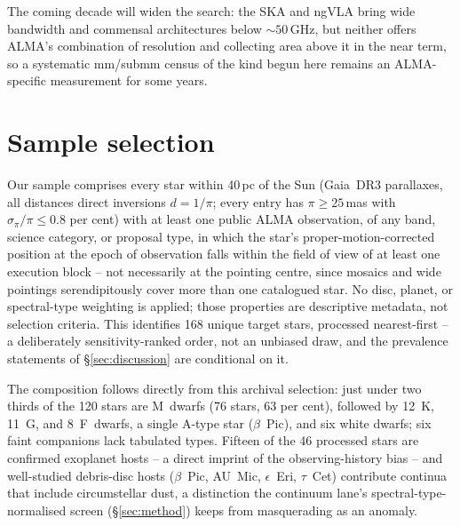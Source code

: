 \documentclass{openjournal}
\begin{document}
The coming decade will widen the search: the SKA
\citep{SKA2015,SKA2026review} and ngVLA \citep{ngVLASETI2022} bring
wide bandwidth and commensal architectures below ${\sim}50$\,GHz, but
neither offers ALMA's combination of resolution and collecting area
above it in the near term, so a systematic mm/submm census of the
kind begun here remains an ALMA-specific measurement for some years.

\section{Sample selection}
\label{sec:sample}

Our sample comprises every star within 40\,pc of the Sun (Gaia~DR3
parallaxes, all distances direct inversions $d = 1/\pi$; every entry
has $\pi \ge 25$\,mas with $\sigma_\pi/\pi \le 0.8$ per cent) with at
least one public ALMA observation, of any band, science category, or
proposal type, in which the star's proper-motion-corrected position at
the epoch of observation falls within the field of view of at least
one execution block -- not necessarily at the pointing centre, since
mosaics and wide pointings serendipitously cover more than one
catalogued star. No disc, planet, or spectral-type weighting is
applied; those properties are descriptive metadata, not selection
criteria. This identifies 168 unique target stars, processed
nearest-first -- a deliberately sensitivity-ranked order, not an
unbiased draw, and the prevalence statements of
\S\ref{sec:discussion} are conditional on it.

The composition follows directly from this archival selection: just
under two thirds of the 120 stars are M~dwarfs (76 stars, 63 per
cent), followed by 12~K, 11~G, and 8~F~dwarfs, a single A-type star
($\beta$~Pic), and six white dwarfs; six faint companions lack
tabulated types. Fifteen of the 46 processed stars are confirmed
exoplanet hosts -- a direct imprint of the observing-history bias --
and well-studied debris-disc hosts ($\beta$~Pic, AU~Mic,
$\epsilon$~Eri, $\tau$~Cet) contribute continua that include
circumstellar dust, a distinction the continuum lane's
spectral-type-normalised screen (\S\ref{sec:method}) keeps from
masquerading as an anomaly.
\end{document}
